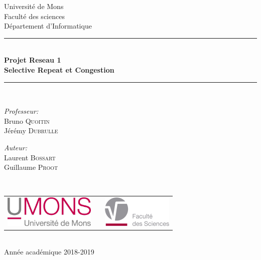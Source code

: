 \documentclass[a4paper, 12pt]{article}
\begin{document}
\begin{titlepage}
\begin{center}

{\Large Université de Mons}\\[1ex]
{\Large Faculté des sciences}\\[1ex]
{\Large Département d'Informatique}\\[2.5cm]

\newcommand{\HRule}{\rule{\linewidth}{0.3mm}}
\HRule \\[0.3cm]
{ \LARGE \bfseries Projet Reseau 1 \\[0.3cm]}
{ \LARGE \bfseries Selective Repeat et Congestion  \\[0.1cm]} %
\HRule \\[1.5cm]

\begin{minipage}[t]{0.45\textwidth}
\begin{flushleft} \large
\emph{Professeur:}\\
Bruno \textsc{Quoitin}\\
Jérémy \textsc{Dubrulle}
\end{flushleft}
\end{minipage}
\begin{minipage}[t]{0.45\textwidth}
\begin{flushright} \large
\emph{Auteur:} \\
Laurent \textsc{Bossart} \\
Guillaume \textsc{Proot} 
\end{flushright}
\end{minipage}\\[2ex]

\vfill

\begin{center}
\begin{tabular}[t]{c c c}
\includegraphics[height=1.5cm]{logoumons.jpg} &
\hspace{0.3cm} &
\includegraphics[height=1.5cm]{logofs.jpg}
\end{tabular}
\end{center}~\\
 
{\large Année académique 2018-2019}

\end{center}
\end{titlepage}
\end{document}
